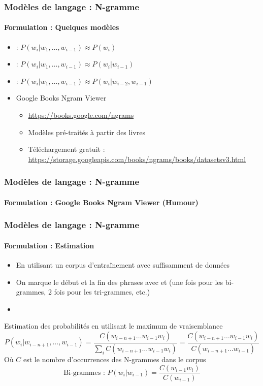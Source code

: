 \documentclass[xcolor=table]{beamer}
\begin{document}
\begin{frame}
\frametitle{Modèles de langage : N-gramme}
\framesubtitle{Formulation : Quelques modèles}

\begin{itemize}
	\item {} : $P(w_i | w_1,\ldots, w_{i-1}) \approx P(w_i)$
	\item {} : $P(w_i | w_1,\ldots, w_{i-1}) \approx P(w_i | w_{i-1})$
	\item {} :  $P(w_i | w_1,\ldots, w_{i-1}) \approx P(w_i | w_{i-2}, w_{i-1})$
	\item Google Books Ngram Viewer
	\begin{itemize}
		\item \url{https://books.google.com/ngrams}
		\item Modèles pré-traités à partir des livres 
		\item Téléchargement gratuit : \url{https://storage.googleapis.com/books/ngrams/books/datasetsv3.html}
	\end{itemize}
\end{itemize}

\end{frame}

\begin{frame}
\frametitle{Modèles de langage : N-gramme}
\framesubtitle{Formulation : Google Books Ngram Viewer (Humour)}


\end{frame}

\begin{frame}
\frametitle{Modèles de langage : N-gramme}
\framesubtitle{Formulation : Estimation}

\begin{itemize}
	\item En utilisant un corpus d'entraînement avec suffisamment de données
	\item On marque le début et la fin des phrases avec  et  (une fois pour les bi-grammes, 2 fois pour les tri-grammes, etc.)
	\item {}
\end{itemize}

\begin{block}{Estimation des probabilités en utilisant le maximum de vraisemblance}
	{\small \[%
	P(w_i | w_{i-n+1},\ldots, w_{i-1}) = \frac{C(w_{i-n+1} \ldots w_{i-1} w_i)}{\sum_i C(w_{i-n+1} \ldots w_{i-1} w_i)}
	= \frac{C(w_{i-n+1} \ldots w_{i-1} w_i)}{C(w_{i-n+1} \ldots w_{i-1})}
	\]}
	Où $C$ est le nombre d'occurrences des N-grammes dans le corpus
	\[%
	\text{Bi-grammes : } P(w_i | w_{i-1}) = \frac{C(w_{i-1} w_i)}{C(w_{i-1})}
	\]
\end{block}

\end{frame}
\end{document}
